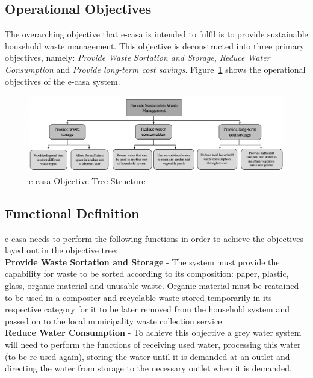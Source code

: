 \documentclass[a4paper,11pt,fleqn]{report}
\begin{document}
\subsection{Operational Objectives}
The overarching objective that \ac{e-casa} is intended to fulfil is to provide sustainable household waste management. This objective is deconstructed into three primary objectives, namely: \textit{Provide Waste Sortation and Storage}, \textit{Reduce Water Consumption} and \textit{Provide long-term cost savings}. Figure~\ref{fig: ecasaOT} shows the operational objectives of the \ac{e-casa} system.\\

\begin{figure}[h!]
\begin{center}
\includegraphics[scale = 0.55]{ecasa_OT.png}
\caption{e-casa Objective Tree Structure}
\label{fig: ecasaOT}
\end{center}
\end{figure}

\subsection{Functional Definition}
\ac{e-casa} needs to perform the following functions in order to achieve the objectives layed out in the objective tree:\\

\noindent\textbf{Provide Waste Sortation and Storage} - The system must provide the capability for waste to be sorted according to its composition: paper, plastic, glass, organic material and unusable waste. Organic material must be reatained to be used in a composter and recyclable waste stored temporarily in its respective category for it to be later removed from the household system and passed on to the local municipality waste collection service.\\

\noindent\textbf{Reduce Water Consumption} - To achieve this objective a grey water system will need to perform the functions of receiving used water, processing this water (to be re-used again), storing the water until it is demanded at an outlet and directing the water from storage to the necessary outlet when it is demanded.\\
\end{document}
